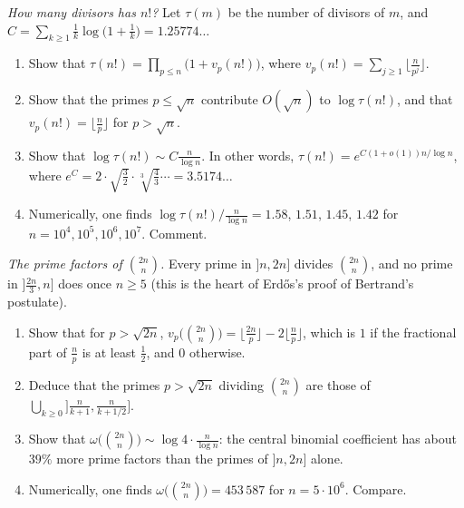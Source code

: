 \begin{exercise}[$\star\star$]\label{pb:factorialdiv}
\emph{How many divisors has $n!$?} Let $\tau(m)$ be the number of divisors of $m$, and $C=\sum_{k\ge1}\frac1k\log\bigl(1+\frac1k\bigr)=1.25774\ldots$
\begin{enumerate}[label=(\alph*)]
\item Show that $\tau(n!)=\prod_{p\le n}\bigl(1+v_p(n!)\bigr)$, where $v_p(n!)=\sum_{j\ge1}\lfloor\frac n{p^j}\rfloor$.
\item Show that the primes $p\le\sqrt n$ contribute $O(\sqrt n)$ to $\log\tau(n!)$, and that $v_p(n!)=\lfloor\frac np\rfloor$ for $p>\sqrt n$.
\item Show that $\log\tau(n!)\sim C\frac n{\log n}$. In other words, $\tau(n!)=e^{C(1+o(1))n/\log n}$, where $e^C=2\cdot\sqrt{\frac32}\cdot\sqrt[3]{\frac43}\cdots=3.5174\ldots$
\item Numerically, one finds $\log\tau(n!)\big/\frac n{\log n}=1.58$, $1.51$, $1.45$, $1.42$ for $n=10^4,10^5,10^6,10^7$. Comment.
\end{enumerate}
\end{exercise}

\begin{exercise}[$\star\star$]\label{pb:centralbinom}
\emph{The prime factors of $\binom{2n}n$.} Every prime in $]n,2n]$ divides $\binom{2n}n$, and no prime in $]\frac{2n}3,n]$ does once $n\ge5$ (this is the heart of Erd\H os's proof of Bertrand's postulate).
\begin{enumerate}[label=(\alph*)]
\item Show that for $p>\sqrt{2n}$, $v_p\bigl(\binom{2n}n\bigr)=\lfloor\frac{2n}p\rfloor-2\lfloor\frac np\rfloor$, which is $1$ if the fractional part of $\frac np$ is at least $\frac12$, and $0$ otherwise.
\item Deduce that the primes $p>\sqrt{2n}$ dividing $\binom{2n}n$ are those of $\bigcup_{k\ge0}\bigl]\frac n{k+1},\frac n{k+1/2}\bigr]$.
\item Show that $\omega\bigl(\binom{2n}n\bigr)\sim\log4\cdot\frac n{\log n}$: the central binomial coefficient has about $39\%$ more prime factors than the primes of $]n,2n]$ alone.
\item Numerically, one finds $\omega\bigl(\binom{2n}n\bigr)=453\,587$ for $n=5\cdot10^6$. Compare.
\end{enumerate}
\end{exercise}

